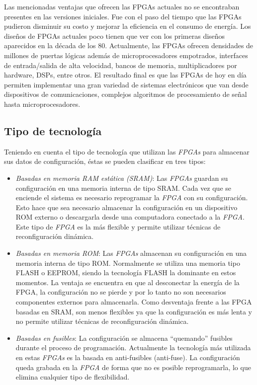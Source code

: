 Las mencionadas ventajas que ofrecen las FPGAs actuales no se
encontraban presentes en las versiones iniciales. Fue con
el paso del tiempo que las FPGAs pudieron disminuir su costo y mejorar
la eficiencia en el consumo de energía. Los diseños de FPGAs actuales
poco tienen que ver con los primeras diseños aparecidos en la década
de los 80. Actualmente, las FPGAs ofrecen densidades de millones de
puertas lógicas además de microprocesadores empotrados, interfaces de
entrada/salida de alta velocidad, bancos de memoria, multiplicadores por
hardware, DSPs, entre otros. El resultado final es que las FPGAs de
hoy en día permiten implementar una gran variedad de sistemas
electrónicos que van desde dispositivos de comunicaciones, complejos
algoritmos de procesamiento de señal hasta microprocesadores.

\subsection{Tipo de tecnología} 

Teniendo en cuenta el tipo de tecnología que utilizan las
\textit{FPGAs} para almacenar sus datos de configuración, éstas se
pueden clasificar en tres tipos:

\begin{itemize}
\item \textit {Basadas en memoria RAM estática (SRAM)}: Las
  \textit{FPGAs} guardan su configuración en una memoria interna de
  tipo SRAM. Cada vez que se enciende el sistema es necesario
  reprogramar la \textit{FPGA} con su configuración. Esto hace que sea
  necesario almacenar la configuración en un dispositivo ROM externo o
  descargarla desde una computadora conectado a la \textit{FPGA}. Este tipo de
  \textit{FPGA} es la más flexible y permite utilizar técnicas de
  reconfiguración dinámica.
\item \textit{Basadas en memoria ROM}: Las \textit{FPGAs} almacenan su
  configuración en una memoria interna de tipo ROM. Normalmente se
  utiliza una memoria tipo FLASH o EEPROM, siendo la tecnología FLASH
  la dominante en estos momentos. La ventaja se encuentra en que al
  desconectar la energía de la FPGA, la configuración no se pierde y
  por lo tanto no son necesarios componentes externos para
  almacenarla. Como desventaja frente a las FPGA basadas en SRAM, son
  menos flexibles ya que la configuración es más lenta y no permite
  utilizar técnicas de reconfiguración dinámica.
\item \textit{Basadas en fusibles}: La configuración se almacena
  “quemando” fusibles durante el proceso de programación. Actualmente
  la tecnología más utilizada en estas \textit{FPGAs} es la basada en
  anti-fusibles (anti-fuse). La configuración queda grabada en la
  \textit{FPGA} de forma que no es posible reprogramarla, lo que
  elimina cualquier tipo de flexibilidad.
\end{itemize}

